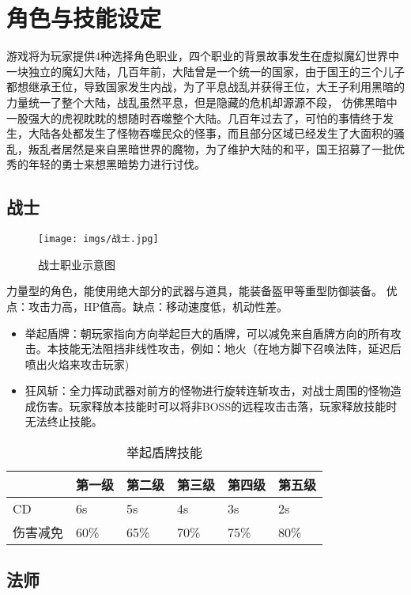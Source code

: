 \section{角色与技能设定}
游戏将为玩家提供4种选择角色职业，四个职业的背景故事发生在虚拟魔幻世界中一块独立的魔幻大陆，几百年前，大陆曾是一个统一的国家，由于国王的三个儿子都想继承王位，导致国家发生内战，为了平息战乱并获得王位，大王子利用黑暗的力量统一了整个大陆，战乱虽然平息，但是隐藏的危机却源源不段， 仿佛黑暗中一股强大的虎视眈眈的想随时吞噬整个大陆。几百年过去了，可怕的事情终于发生，大陆各处都发生了怪物吞噬民众的怪事，而且部分区域已经发生了大面积的骚乱，叛乱者居然是来自黑暗世界的魔物，为了维护大陆的和平，国王招募了一批优秀的年轻的勇士来想黑暗势力进行讨伐。

\subsection{战士}

\begin{figure}[ht]
    \centering
    \texttt{[image: imgs/战士.jpg]}
    \caption{战士职业示意图}
\end{figure}

力量型的角色，能使用绝大部分的武器与道具，能装备盔甲等重型防御装备。
优点：攻击力高，HP值高。缺点：移动速度低，机动性差。

\begin{itemize}
    \item 举起盾牌：朝玩家指向方向举起巨大的盾牌，可以减免来自盾牌方向的所有攻击。本技能无法阻挡非线性攻击，例如：地火（在地方脚下召唤法阵，延迟后喷出火焰来攻击玩家)
    \item 狂风斩：全力挥动武器对前方的怪物进行旋转连斩攻击，对战士周围的怪物造成伤害。玩家释放本技能时可以将非BOSS的远程攻击击落，玩家释放技能时无法终止技能。
\end{itemize}

\begin{table}[h]
    \centering
    \caption{举起盾牌技能}
    \begin{tabular}{@{}llllll@{}}
    \toprule
         & 第一级  & 第二级  & 第三级  & 第四级  & 第五级  \\ \midrule
    CD   & 6s   & 5s   & 4s   & 3s   & 2s   \\
    伤害减免 & 60\% & 65\% & 70\% & 75\% & 80\% \\ \bottomrule
    \end{tabular}
\end{table}

\subsection{法师}

